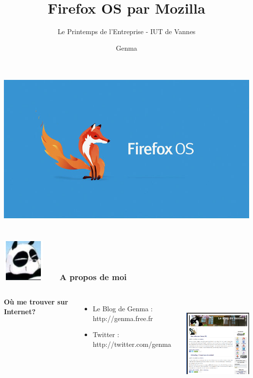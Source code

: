 \documentclass{beamer}
\title[Firefox OS par Mozilla]{Firefox OS par Mozilla}
\author{Le Printemps de l'Entreprise - IUT de Vannes}
\author{Genma}
\begin{document}
\begin{frame}
	\titlepage
	\begin{center}		
	\includegraphics[scale=0.2]{./images/firefox-os.jpg}
		\\	
	\\[2.5ex]
		{\tiny\CcNote{\CcLongnameByNcSa}}
		\vspace*{-2.5ex}
	\end{center}
\end{frame}

\begin{frame}
\frametitle{\includegraphics[scale=0.4]{./images/Genma.jpg} \ \ \  A propos de moi  }
\begin{columns}[c] 
\textbf{Où me trouver sur Internet?}
\begin{itemize}
\item Le Blog de Genma : http://genma.free.fr
\item Twitter : http://twitter.com/genma
\end{itemize}

\includegraphics[width=5cm,height=5cm]{./images/blog.png} 
\end{columns}
\end{frame}
\end{document}
